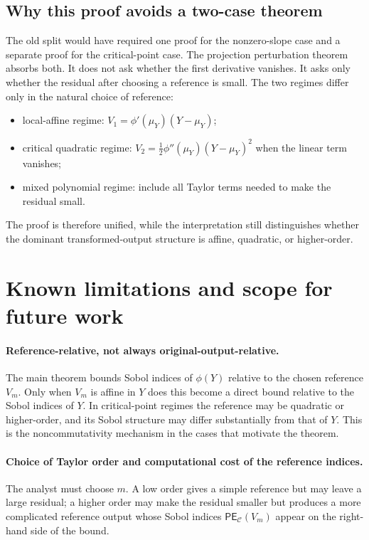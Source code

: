 \documentclass[11pt,letterpaper]{article}
\theoremstyle{remark}
\begin{document}
\subsection*{Why this proof avoids a two-case theorem}

The old split would have required one proof for the nonzero-slope case and a
separate proof for the critical-point case. The projection perturbation theorem
absorbs both. It does not ask whether the first derivative vanishes. It asks only
whether the residual after choosing a reference is small. The two regimes differ
only in the natural choice of reference:
\begin{itemize}
  \item local-affine regime: $V_1=\phi'(\mu_Y)(Y-\mu_Y)$;
  \item critical quadratic regime: $V_2=\frac12\phi''(\mu_Y)(Y-\mu_Y)^2$ when the
    linear term vanishes;
  \item mixed polynomial regime: include all Taylor terms needed to make the
    residual small.
\end{itemize}
The proof is therefore unified, while the interpretation still distinguishes
whether the dominant transformed-output structure is affine, quadratic, or
higher-order.

\section{Known limitations and scope for future work}
\label{app:limitations}

\paragraph{Reference-relative, not always original-output-relative.}
The main theorem bounds Sobol indices of $\phi(Y)$ relative to the chosen
reference $V_m$. Only when $V_m$ is affine in $Y$ does this become a direct bound
relative to the Sobol indices of $Y$. In critical-point regimes the reference may
be quadratic or higher-order, and its Sobol structure may differ substantially
from that of $Y$. This is the noncommutativity mechanism in the cases that
motivate the theorem.

\paragraph{Choice of Taylor order and computational cost of the reference indices.}
The analyst must choose $m$. A low order gives a simple reference but may leave a
large residual; a higher order may make the residual smaller but produces a more
complicated reference output whose Sobol indices $\mathsf{PE}_{\mathscr C}(V_m)$
appear on the right-hand side of the bound.
\end{document}
